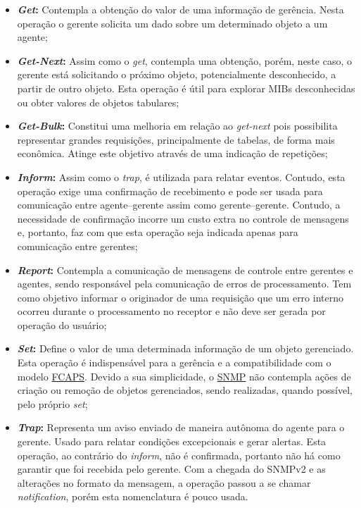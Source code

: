 \documentclass[twoside,english,brazilian]{UNISINOSmonografia}
\begin{document}
\begin{itemize}

\item \textbf{\textit{Get}:}
Contempla a obtenção do valor de uma informação de gerência. Nesta operação o 
gerente solicita um dado sobre um determinado objeto a um agente;

\item \textbf{\textit{Get-Next}:}
Assim como o \textit{get}, contempla uma obtenção, porém, neste caso, o 
gerente está solicitando o próximo objeto, potencialmente desconhecido, a 
partir de outro objeto. 
Esta operação é útil para explorar MIBs desconhecidas ou obter valores 
de objetos tabulares;

\item \textbf{\textit{Get-Bulk}:}
Constitui uma melhoria em relação ao \textit{get-next} pois possibilita 
representar grandes requisições, principalmente de tabelas, de forma mais 
econômica.
Atinge este objetivo através de uma indicação de repetições;

\item \textbf{\textit{Inform}:}
Assim como o \textit{trap}, é utilizada para relatar eventos.
Contudo, esta operação exige uma confirmação de recebimento e pode ser usada 
para comunicação entre agente--gerente assim como gerente--gerente.
Contudo, a necessidade de confirmação incorre um custo extra no controle de 
mensagens e, portanto, faz com que esta operação seja indicada apenas para 
comunicação entre gerentes;

\item \textbf{\textit{Report}:}
Contempla a comunicação de mensagens de controle entre gerentes e agentes, 
sendo responsável pela comunicação de erros de processamento.
Tem como objetivo informar o originador de uma requisição que um erro interno 
ocorreu durante o processamento no receptor e não deve ser gerada por operação 
do usuário;

\item \textbf{\textit{Set}:}
Define o valor de uma determinada informação de um objeto gerenciado. 
Esta operação é indispensável para a gerência e a compatibilidade com o 
modelo \hyperref[siglas]{FCAPS}. 
Devido a sua simplicidade, o \hyperref[siglas]{SNMP} não contempla ações de criação ou remoção de 
objetos gerenciados, sendo realizadas, quando possível, pelo próprio \textit{set};

\item \textbf{\textit{Trap}:}
Representa um aviso enviado de maneira autônoma do agente para o gerente. 
Usado para relatar condições excepcionais e gerar alertas.
Esta operação, ao contrário do \textit{inform}, não é confirmada, portanto
não há como garantir que foi recebida pelo gerente.
Com a chegada do SNMPv2 e as alterações no formato da mensagem, 
a operação passou a se chamar \textit{notification}, 
porém esta nomenclatura é pouco usada.

\end{itemize}
\end{document}
